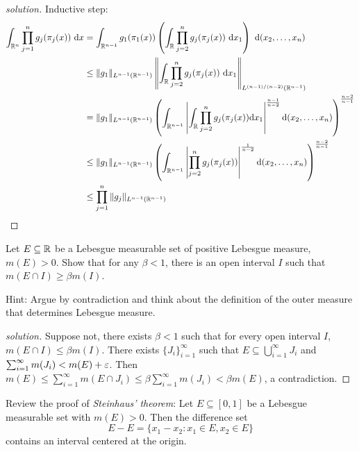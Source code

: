 \begin{proof}[solution]
  Inductive step:
  \begin{align*}
    \int_{\mathbb R^n} \prod_{j=1}^n g_j(\pi_j(x))\ \mathrm{d}x &= \int_{\mathbb R^{n-1}} g_1(\pi_1(x))\left(\int_{\mathbb R} \prod_{j=2}^{n} g_j(\pi_j(x))\ \mathrm{d}x_1\right)\ \mathrm{d}(x_2,\dotsc,x_{n})\\  
    &\le \|g_1\|_{L^{n-1}(\mathbb R^{n-1})} \left\|\int_{\mathbb R} \prod_{j=2}^{n} g_j(\pi_j(x))\ \mathrm{d}x_1\right\|_{L^{(n-1)/(n-2)}(\mathbb R^{n-1})} \\
    &= \|g_1\|_{L^{n-1}(\mathbb R^{n-1})} \left(\int_{\mathbb R^{n-1}}\left|\int_{\mathbb R} \prod_{j=2}^{n} g_j(\pi_j(x))\mathrm{d}x_1\right|^{\frac{n-1}{n-2}}\mathrm{d}(x_2,\dotsc,x_{n})\right)^{\frac{n-2}{n-1}}\\
    &\le \|g_1\|_{L^{n-1}(\mathbb R^{n-1})} \left(\int_{\mathbb R^{n-1}}\left|\prod_{j=2}^{n} g_j(\pi_j(x))\right|^{\frac{1}{n-2}}\mathrm{d}(x_2,\dotsc,x_{n})\right)^{\frac{n-2}{n-1}}\\
    &\le \prod_{j=1}^n \|g_j\|_{L^{n-1}(\mathbb R^{n-1})}
  \end{align*} 
\end{proof}

\begin{problem}
  Let $E \subseteq \mathbb R$ be a Lebesgue measurable set of positive Lebesgue measure, $m(E) > 0$. 
  Show that for any $\beta < 1$, there is an open interval $I$ such that $m(E \cap I) \ge \beta m(I)$.

  Hint: Argue by contradiction and think about the definition of the outer measure
  that determines Lebesgue measure.
\end{problem}

\begin{proof}[solution]
  Suppose not, there exists $\beta < 1$ such that for every open interval $I$, $m(E \cap I) \le \beta m(I)$. 
  There exists $\{J_i\}_{i=1}^\infty$ such that $E \subseteq \bigcup_{i=1}^\infty J_i$ and $\sum_{i=1}^\infty m(J_i) < m(E) + \varepsilon$. 
  Then $m(E) \le \sum_{i=1}^\infty m(E \cap J_i) \le \beta \sum_{i=1}^\infty m(J_i) < \beta m(E)$, a contradiction.
\end{proof}

\begin{problem}
  Review the proof of \textit{Steinhaus' theorem}: Let $E \subseteq [0, 1]$ be a Lebesgue 
  measurable set with $m(E) > 0$. Then the difference set
  \[E-E = \{x_1 - x_2 : x_1 \in E, x_2 \in E\}\]
  contains an interval centered at the origin.
\end{problem}

